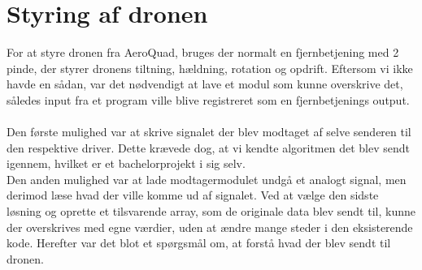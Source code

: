 \documentclass[Main]{subfiles}
\begin{document}
\section{Styring af dronen}
For at styre dronen fra AeroQuad, bruges der normalt en fjernbetjening med 2 pinde, der styrer dronens tiltning, hældning, rotation og opdrift.
Eftersom vi ikke havde en sådan, var det nødvendigt at lave et modul som kunne overskrive det, således input fra et program ville blive registreret som en fjernbetjenings output.
\\
\\
Den første mulighed var at skrive signalet der blev modtaget af selve senderen til den respektive driver. 
Dette krævede dog, at vi kendte algoritmen det blev sendt igennem, hvilket er et bachelorprojekt i sig selv.
\\
Den anden mulighed var at lade modtagermodulet undgå et analogt signal, men derimod læse hvad der ville komme ud af signalet.
Ved at vælge den sidste løsning og oprette et tilsvarende array, som de originale data blev sendt til, kunne der overskrives med egne værdier, uden at ændre mange steder i den eksisterende kode.
Herefter var det blot et spørgsmål om, at forstå hvad der blev sendt til dronen.
\end{document}
